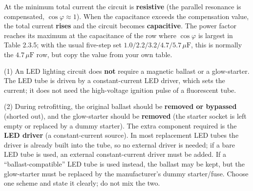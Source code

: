 \documentclass[11pt]{ctexart}
\begin{document}
At the minimum total current the circuit is \textbf{resistive} (the parallel resonance is compensated, \(\cos\varphi\approx1\)). When the capacitance exceeds the compensation value, the total current \textbf{rises} and the circuit becomes \textbf{capacitive}. The power factor reaches its maximum at the capacitance of the row where \(\cos\varphi\) is largest in Table 2.3.5; with the usual five-step set \(1.0/2.2/3.2/4.7/5.7\,\mu\mathrm{F}\), this is normally the \(4.7\,\mu\mathrm{F}\) row, but copy the value from your own table.

(1) An LED lighting circuit does \textbf{not} require a magnetic ballast or a glow-starter. The LED tube is driven by a constant-current LED driver, which sets the current; it does not need the high-voltage ignition pulse of a fluorescent tube.

(2) During retrofitting, the original ballast should be \textbf{removed or bypassed} (shorted out), and the glow-starter should be \textbf{removed} (the starter socket is left empty or replaced by a dummy starter). The extra component required is the \textbf{LED driver} (a constant-current source). In most replacement LED tubes the driver is already built into the tube, so no external driver is needed; if a bare LED tube is used, an external constant-current driver must be added. If a ``ballast-compatible'' LED tube is used instead, the ballast may be kept, but the glow-starter must be replaced by the manufacturer's dummy starter/fuse. Choose one scheme and state it clearly; do not mix the two.

\flowerrule
{}
\end{document}
